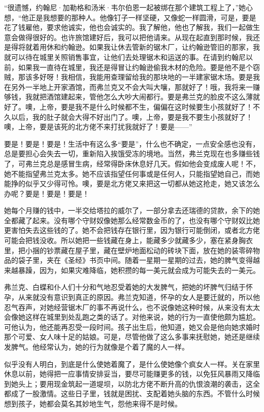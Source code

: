 \par “很遗憾，约翰尼·加勒格和汤米·韦尔伯恩一起被绑在那个建筑工程上了，”她心想，“他正是我想要的那种人。他像钉子一样坚硬，又像蛇一样圆滑，可是，要是花了钱雇他，要求他诚实，他也会诚实的。我了解他，他也了解我，我们一起做生意会做得很好的。也许旅馆建好后，我可以把他请来。从现在起直到那时候，我还是得将就着用休和约翰逊。如果我让休去管新的锯木厂，让约翰逊管旧的那家，我就可以待在城里关照销售事宜，让他们去处理锯木和运送的事。在请到约翰尼以前，如果我一直待在城里，我还是得冒让约翰逊偷我木材的危险。要是他不是个窃贼，那该多好呀！我相信，我能用查理留给我的那块地的一半建家锯木场。要是我在另外一半地上开家酒馆，而弗兰克又不会大叫大嚷，那就好了！哦，我将来一赚够钱，我就把酒馆建起来，管他怎么大吵大闹都行。要是弗兰克的脸皮不这么薄就好了。噢，上帝，要是我不是什么时候都不生，偏偏在这时候要生小孩就好了！不久以后，我的肚子就会大得不好出门了。噢，上帝，要是我不要生小孩就好了！噢，上帝，要是该死的北方佬不来打扰我就好了！要是——”
\par 要是！要是！要是！生活中有这么多“要是”，什么也不确定，一点安全感也没有，总是要担心会失去一切，重新陷入挨饿受冻的境地。当然，弗兰克现在也多赚些钱了，可弗兰克总是感冒生病，经常得卧床休息好几天。假如他会变成废人呢！不，她不能指望弗兰克太多。她不应该指望任何事或是任何人，只能指望她自己，而她能挣的似乎又少得可怜。噢，要是北方佬又来把这一切都从她这抢走，她又该怎么办呢？要是！要是！要是！
\par 她每个月赚的钱中，一半交给塔拉的威尔了，一部分拿去还瑞德的贷款，余下的她全都藏了起来。没有哪个守财奴像她那么经常数金币的了，也没有哪个守财奴比她更害怕失去这些钱的了。她不会把钱存在银行里，因为银行可能倒闭，或者北方佬可能会把钱没收。所以她把一些钱藏在身上，能藏多少就藏多少，塞在紧身胸衣里，把小捆的钞票藏在屋子里，藏在壁炉地面松动的砖块下面，放在她的装零碎物品的袋子里，夹在《圣经》书页中间。随着一星期一星期的过去，她的脾气变得越来越暴躁，因为，如果灾难降临，她积攒的每一美元就会成为可能失去的一美元。
\par 弗兰克、白蝶和仆人们十分和气地忍受着她的大发脾气，把她的坏脾气归结于怀孕，从来就没有意识到真正的原因。弗兰克知道，怀孕的女人是要迁就的，所以他忍气吞声，对她经营锯木厂的事不再说什么，也不说像她这种时候，从来没有太太会像她这样在城里到处乱跑之类的话了。对他来说，她的行为一直使他颇为尴尬。可他认为，他还能再忍受一段时间。孩子出生后，他知道，她又会是他向她求婚时那个可爱、女人味十足的姑娘。可是，尽管他做了这么多事来抚慰她，她还是继续发脾气。他经常认为，她的行为就像是个着了魔的人一样。
\par 似乎没有人明白，到底是什么使她着魔了，是什么使她像个疯女人一样。关在家里休息以前，她得把一应事情安排妥当，要尽可能赚更多的钱，以免狂风暴雨又降临到她头上；要用现金筑起一道堤坝，以防北方佬不断升高的仇恨浪潮的袭击，这全都成了一股激情。这些日子里，钱就是困扰、支配着她头脑的东西。不管什么时候想到孩子，她都会莫名其妙地生气，怨他来得不是时候。

